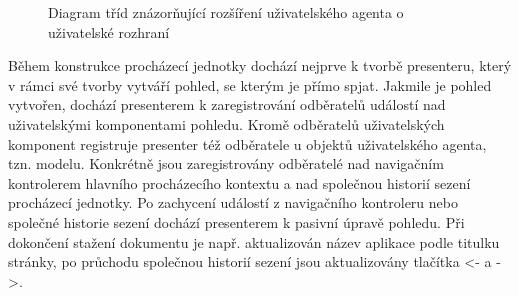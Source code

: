 \begin{figure}[H]
  \begin{center}
    \caption{Diagram tříd znázorňující rozšíření uživatelského agenta o uživatelské rozhraní}
    \label{Figure.SimpleBrowserUiController}
  \end{center}
\end{figure}

Během konstrukce procházecí jednotky dochází nejprve k tvorbě presenteru, který v rámci své tvorby vytváří pohled, se kterým je přímo spjat. Jakmile je pohled vytvořen, dochází presenterem k zaregistrování odběratelů událostí nad uživatelskými komponentami pohledu. Kromě odběratelů uživatelských komponent registruje presenter též odběratele u objektů uživatelského agenta, tzn. modelu. Konkrétně jsou zaregistrovány odběratelé nad navigačním kontrolerem hlavního procházecího kontextu a nad společnou historií sezení procházecí jednotky. Po zachycení událostí z navigačního kontroleru nebo společné historie sezení dochází presenterem k pasivní úpravě pohledu. Při dokončení stažení dokumentu je např. aktualizován název aplikace podle titulku stránky, po průchodu společnou historií sezení jsou aktualizovány tlačítka <- a ->.

